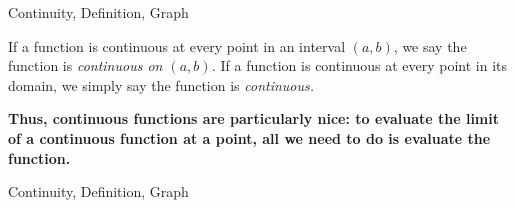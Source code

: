 \begin{tagblock}{Continuity, Definition, Graph}
\begin{question}
If a function is continuous at every point in an interval $(a,b)$, we say the function is \emph{continuous on $(a,b)$.}  If a function is continuous at every point in its domain, we simply say the function is \emph{continuous.} 

\textbf{Thus, continuous functions are particularly nice: to evaluate the limit of a continuous function at a point, all we need to do is evaluate the function.}
	
	
\begin{tags}
	   Continuity, Definition, Graph
\end{tags}
	
\begin{diary}
	 
\end{diary}


	

	\end{question}
	
	\end{tagblock}






